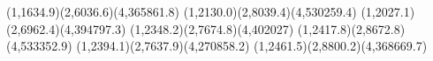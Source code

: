 \plot
{(1,1634.9)(2,6036.6)(4,365861.8)}
{(1,2130.0)(2,8039.4)(4,530259.4)}
{(1,2027.1)(2,6962.4)(4,394797.3)}
{(1,2348.2)(2,7674.8)(4,402027)}
{(1,2417.8)(2,8672.8)(4,533352.9)}
{(1,2394.1)(2,7637.9)(4,270858.2)}
{(1,2461.5)(2,8800.2)(4,368669.7)}